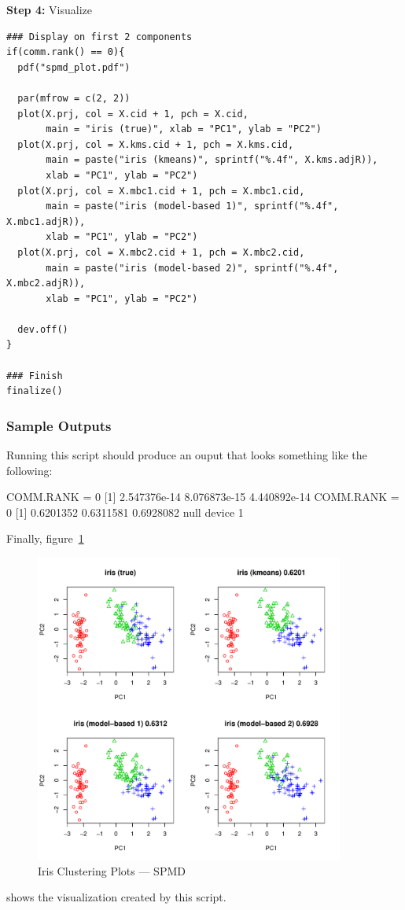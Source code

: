 \textbf{Step 4:}  Visualize\vspace{-.6cm}
\begin{lstlisting}[language=rr]
### Display on first 2 components
if(comm.rank() == 0){
  pdf("spmd_plot.pdf")
  
  par(mfrow = c(2, 2))
  plot(X.prj, col = X.cid + 1, pch = X.cid,
       main = "iris (true)", xlab = "PC1", ylab = "PC2")
  plot(X.prj, col = X.kms.cid + 1, pch = X.kms.cid,
       main = paste("iris (kmeans)", sprintf("%.4f", X.kms.adjR)),
       xlab = "PC1", ylab = "PC2")
  plot(X.prj, col = X.mbc1.cid + 1, pch = X.mbc1.cid,
       main = paste("iris (model-based 1)", sprintf("%.4f", X.mbc1.adjR)),
       xlab = "PC1", ylab = "PC2")
  plot(X.prj, col = X.mbc2.cid + 1, pch = X.mbc2.cid,
       main = paste("iris (model-based 2)", sprintf("%.4f", X.mbc2.adjR)),
       xlab = "PC1", ylab = "PC2")

  dev.off()
}

### Finish
finalize()
\end{lstlisting}

\subsubsection{Sample Outputs}
Running this script should produce an ouput that looks something like the following:
\begin{Output}
COMM.RANK = 0
[1] 2.547376e-14 8.076873e-15 4.440892e-14
COMM.RANK = 0
[1] 0.6201352 0.6311581 0.6928082
null device 
          1 
\end{Output}

Finally, figure~\ref{fig:iris_cluster_spmd}
\begin{figure}[h!bt]
  \centering
  \includegraphics[width=4in]{pbdDEMO-include/pics/spmd_plot.pdf}
  \caption{Iris Clustering Plots --- SPMD}
  \label{fig:iris_cluster_spmd}
\end{figure}
shows the visualization created by this script.













